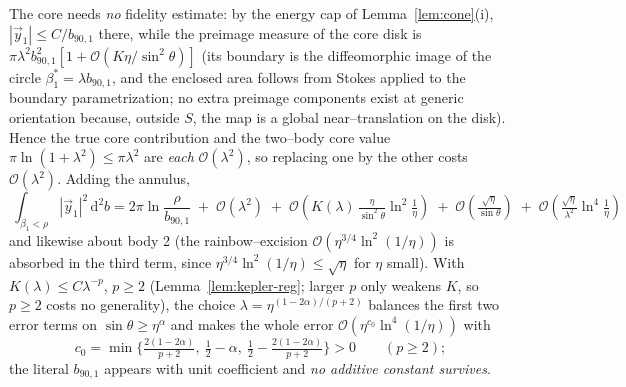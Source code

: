 \documentclass[11pt]{article}
\newcommand{\dd}{\mathrm{d}}
\newcommand{\order}[1]{\mathcal O\!\left(#1\right)}
\begin{document}
The core needs \emph{no} fidelity estimate: by the energy cap of Lemma~\ref{lem:cone}(i),
$|\vec y_1|\le C/b_{90,1}$ there, while the preimage measure of the core disk is
$\pi\lambda^2b_{90,1}^2[1+\order{K\eta/\sin^2\theta}]$ (its boundary is the diffeomorphic image of
the circle $\beta_1^*=\lambda b_{90,1}$, and the enclosed area follows from Stokes applied to the
boundary parametrization; no extra preimage components exist at generic orientation because,
outside $S$, the map is a global near--translation on the disk). Hence the true core contribution
and the two--body core value $\pi\ln(1+\lambda^2)\le\pi\lambda^2$ are \emph{each}
$\order{\lambda^2}$, so replacing one by the other costs $\order{\lambda^2}$. Adding the annulus,
\begin{equation}
  \boxed{\ \int_{\beta_1<\rho}|\vec y_1|^2\,\dd^2b=2\pi\ln\frac{\rho}{b_{90,1}}
  \;+\;\order{\lambda^2}
  \;+\;\order{K(\lambda)\,\tfrac{\eta}{\sin^2\theta}\ln^2\tfrac1\eta}
  \;+\;\order{\tfrac{\sqrt\eta}{\sin\theta}}
  \;+\;\order{\tfrac{\sqrt\eta}{\lambda^2}\ln^4\tfrac1\eta}\ }
  \label{eq:near-result}
\end{equation}
and likewise about body 2 (the rainbow--excision $\order{\eta^{3/4}\ln^2(1/\eta)}$ is absorbed in
the third term, since $\eta^{3/4}\ln^2(1/\eta)\le\sqrt\eta$ for $\eta$ small). With
$K(\lambda)\le C\lambda^{-p}$, $p\ge2$
(Lemma~\ref{lem:kepler-reg}; larger $p$ only weakens $K$, so $p\ge2$ costs no generality), the
choice $\lambda=\eta^{(1-2\alpha)/(p+2)}$ balances the first two error terms on
$\sin\theta\ge\eta^\alpha$ and makes the whole error
$\order{\eta^{c_0}\ln^4(1/\eta)}$ with
\begin{equation*}
c_0=\min\Big\{\tfrac{2(1-2\alpha)}{p+2},\ \tfrac12-\alpha,\ \tfrac12-\tfrac{2(1-2\alpha)}{p+2}\Big\}>0
\qquad(p\ge2);
\end{equation*}
the literal
$b_{90,1}$ appears with unit coefficient and \emph{no additive constant survives}.
\end{document}
